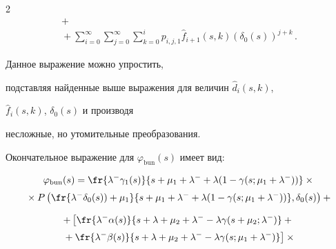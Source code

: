 \begin{multicols}{2}
\begin{multline*}
+ {}\\[2pt]


{}+\sum\limits_{i=0}^\infty \sum\limits_{j=0}^\infty


\sum\limits_{k=0}^{i} p_{i,j,1}


\hat f_{i+1}(s,k) (\delta_0(s))^{j+k}\,.


\end{multline*}


Данное выражение можно упростить,


подставляя найденные выше выражения для величин $\hat d_{i}(s,k)$,


$\hat f_{i}(s,k)$, $\delta_0(s)$ и производя


несложные, но утомительные преобразования.


Окончательное выражение для $\varphi_{\mathrm{bun}}(s)$ имеет вид:


\begin{multline*}


\varphi_{\mathrm{bun}}(s) = \fr{\lambda^- \gamma_1(s)}{s + \mu_1 + \lambda^- + \lambda (1 - \gamma(s;\mu_1 + \lambda^-))}


\times{}\\[2pt]


{}\times


P \left( \fr{\lambda^- \delta_0(s)  ) + \mu_1 }{


s + \mu_1 + \lambda^- + \lambda (1 - \gamma(s;\mu_1 + \lambda^-))}, \delta_0(s)


\right)


+{}


\end{multline*}





\noindent


\begin{multline*}


+


\left [


\fr{\lambda^- \alpha (s) }{s+\lambda+\mu_2 + \lambda^- - \lambda \gamma(s+\mu_2;\lambda^-)}


+{}


\right.\\[2pt]


\left.{}+\fr{\lambda^- \beta (s) }{s+\lambda+\mu_2 + \lambda^- - \lambda \gamma(s; \mu_1 + \lambda^-)}


\right]


\times{}


\\[2pt]



\end{multline*}
\end{multicols}

